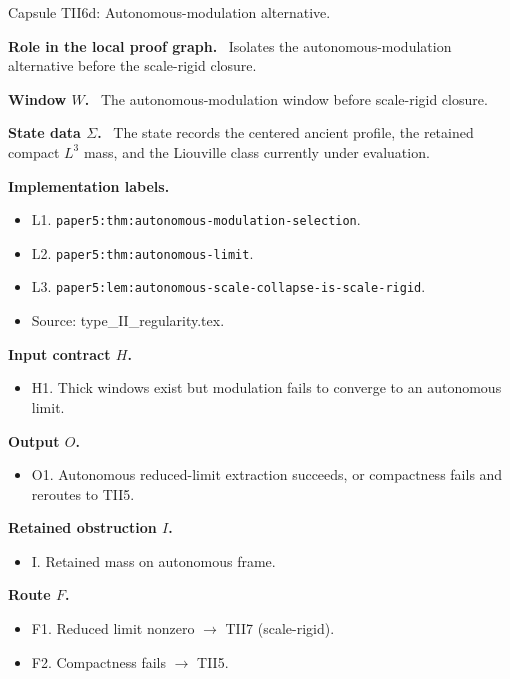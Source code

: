 \documentclass[11pt]{amsart}
\newcommand{\capsulefield}[1]{\par\smallskip\noindent\textbf{#1.}\ }
\begin{document}
\begin{proofcapsule}{Capsule TII6d: Autonomous-modulation alternative.}
  \capsulefield{Role in the local proof graph}
  Isolates the autonomous-modulation alternative before the scale-rigid closure.

  \capsulefield{Window \(W\)}
The autonomous-modulation window before scale-rigid closure.

  \capsulefield{State data \(\Sigma\)}
The state records the centered ancient profile, the retained compact $L^3$ mass, and the Liouville class currently under evaluation.

  \capsulefield{Implementation labels}
  \begin{itemize}[leftmargin=1.8em]
  \item L1. \texttt{paper5:thm:autonomous-modulation-selection}.
  \item L2. \texttt{paper5:thm:autonomous-limit}.
  \item L3. \texttt{paper5:lem:autonomous-scale-collapse-is-scale-rigid}.
  \item Source: type\_II\_regularity.tex.
  \end{itemize}

  \capsulefield{Input contract \(H\)}
  \begin{itemize}[leftmargin=1.8em]
  \item H1. Thick windows exist but modulation fails to converge to an autonomous limit.
  \end{itemize}

  \capsulefield{Output \(O\)}
  \begin{itemize}[leftmargin=1.8em]
  \item O1. Autonomous reduced-limit extraction succeeds, or compactness fails and reroutes to TII5.
  \end{itemize}

  \capsulefield{Retained obstruction \(I\)}
  \begin{itemize}[leftmargin=1.8em]
  \item I. Retained mass on autonomous frame.
  \end{itemize}

  \capsulefield{Route \(F\)}
  \begin{itemize}[leftmargin=1.8em]
  \item F1. Reduced limit nonzero $\to$ TII7 (scale-rigid).
  \item F2. Compactness fails $\to$ TII5.
  \end{itemize}


\end{proofcapsule}
\end{document}
